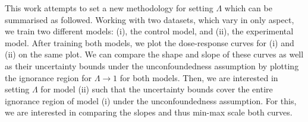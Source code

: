 This work attempts to set a new methodology for setting $\Lambda$ which can be summarised as followed.
Working with two datasets, which vary in only aspect, we train two different models: (i), the control model, and (ii), the experimental model. 
After training both models, we plot the dose-response curves for (i) and (ii) on the same plot. 
We can compare the shape and slope of these curves as well as their uncertainty bounds under the unconfoundedness assumption by plotting the ignorance region for $\Lambda \to 1$ for both models. 
Then, we are interested in setting $\Lambda$ for model (ii) such that the uncertainty bounds cover the entire ignorance region of model (i) under the unconfoundedness assumption. 
For this, we are interested in comparing the slopes and thus min-max scale both curves. 